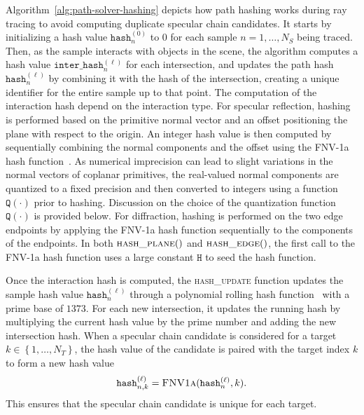 Algorithm~\ref{alg:path-solver-hashing} depicts how path hashing works during ray tracing to avoid computing duplicate specular chain candidates.
It starts by initializing a hash value $\texttt{hash}_n^{(0)}$ to $0$ for each sample $n = 1,\dots,N_S$ being traced.
Then, as the sample interacts with objects in the scene, the algorithm computes a hash value $\texttt{inter\_hash}_n^{(\ell)}$ for each intersection, and updates the path hash $\texttt{hash}_n^{(\ell)}$ by combining it with the hash of the intersection, creating a unique identifier for the entire sample up to that point.
The computation of the interaction hash depend on the interaction type.
For specular reflection, hashing is performed based on the primitive normal vector and an offset positioning the plane with respect to the origin.
An integer hash value is then computed by sequentially combining the normal components and the offset using the FNV-1a hash function~\cite{fnv1a}.
As numerical imprecision can lead to slight variations in the normal vectors of coplanar primitives, the real-valued normal components are quantized to a fixed precision and then converted to integers using a function $\texttt{Q}(\cdot)$ prior to hashing.
Discussion on the choice of the quantization function $\texttt{Q}(\cdot)$ is provided below.
For diffraction, hashing is performed on the two edge endpoints by applying the FNV-1a hash function sequentially to the components of the endpoints.
In both $\Call{hash\_plane}$ and $\Call{hash\_edge}$, the first call to the FNV-1a hash function uses a large constant $\texttt{H}$ to seed the hash function.

Once the interaction hash is computed, the \textsc{hash\_update} function updates the sample hash value $\texttt{hash}_n^{(\ell)}$ through a polynomial rolling hash function~\cite{Wikipedia_Rolling_hash} with a prime base of $1373$.
For each new intersection, it updates the running hash by multiplying the current hash value by the prime number and adding the new intersection hash.
When a specular chain candidate is considered for a target $k \in \left\{1, \dots, N_T\right\}$, the hash value of the candidate is paired with the target index $k$ to form a new hash value
\begin{equation}
    \texttt{hash}_{n,k}^{(\ell)} = \Call{FNV1a}{\texttt{hash}_n^{(\ell)}, k}.
\end{equation}
This ensures that the specular chain candidate is unique for each target.


